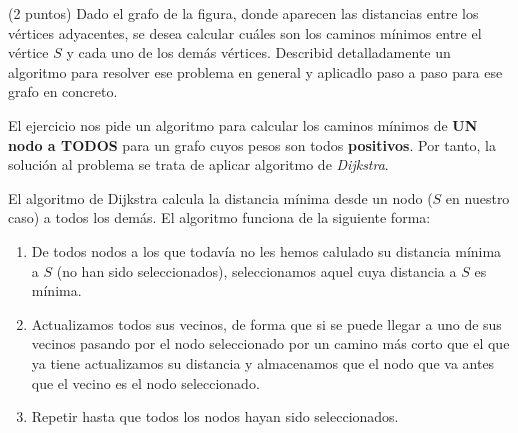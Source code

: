 \documentclass[12pt]{article}
\begin{document}
    \begin{ejercicio}
        (2 puntos) Dado el grafo de la figura, donde aparecen las distancias entre los vértices adyacentes, se
        desea calcular cuáles son los caminos mínimos entre el vértice $S$ 
        y cada uno de los demás vértices.
        Describid detalladamente un algoritmo para resolver ese problema en general y aplicadlo paso a
        paso para ese grafo en concreto.

        \begin{center}
        \end{center}

        El ejercicio nos pide un algoritmo para calcular los caminos 
        mínimos de \textbf{UN nodo a TODOS} para un grafo cuyos pesos 
        son todos 
        \textbf{positivos}. Por tanto, la solución al problema se trata 
        de aplicar algoritmo de \textit{Dijkstra}.

        El algoritmo de Dijkstra calcula la distancia mínima desde 
        un nodo ($S$ en nuestro caso) a todos los demás. El algoritmo
        funciona de la siguiente forma:
        \begin{enumerate}
            \item De todos nodos a los que todavía no les hemos calulado su 
                distancia mínima a $S$ (no han sido 
                seleccionados), seleccionamos aquel cuya distancia a $S$ 
                es mínima.
            \item Actualizamos todos sus vecinos, de forma que si 
                se puede llegar a uno de sus vecinos pasando por el nodo 
                seleccionado por un camino más corto que el que ya tiene 
                actualizamos su distancia y almacenamos que el nodo 
                que va antes que el vecino es el nodo seleccionado.
            \item Repetir hasta que todos los nodos hayan sido seleccionados.
        \end{enumerate}


\end{ejercicio}
\end{document}
